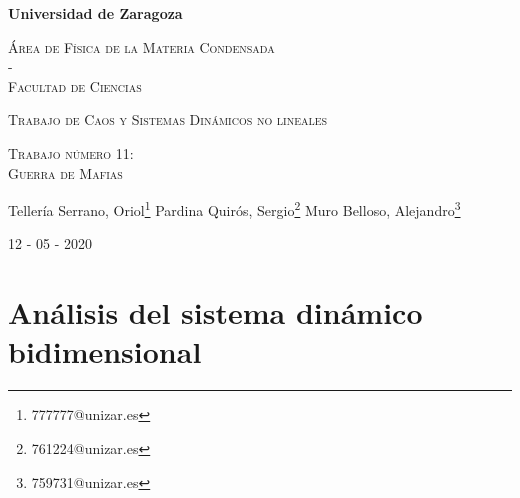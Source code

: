 \documentclass[11pt]{article}
\begin{document}
\begin{titlepage}
\centering
\vspace{1cm}
{\bfseries\LARGE Universidad de Zaragoza \par}
\vspace{1cm}
{\scshape\Large Área de Física de la Materia Condensada\\
-\\
Facultad de Ciencias \par}
\vspace{2cm}
{\scshape\Huge Trabajo de Caos y Sistemas Dinámicos no lineales \par}
\vspace{0.5cm}
{\scshape\Large Trabajo número 11:\\
Guerra de Mafias \par}
\vspace{0.3cm}
Tellería Serrano, Oriol\footnote[2]{777777@unizar.es}
Pardina Quirós, Sergio\footnote[3]{761224@unizar.es}
Muro Belloso, Alejandro\footnote[4]{759731@unizar.es} \par
\vspace{1cm}
\vspace{1cm}
{\Large 12 - 05 - 2020 \par}
\end{titlepage}

\begin{comment}
\setmargins{2.5cm}
{1.5cm}                        %
{16.5cm}                      %
{23.42cm}                    %
{10pt}                           %
{1cm}                           %
{0pt}                             %
{2cm}    %
\end{comment}
\newpage

\section*{Análisis del sistema dinámico bidimensional}
\end{document}
